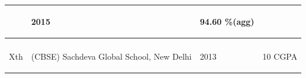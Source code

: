 \documentclass[11pt]{article}
\begin{document}
\begin{flushleft}
\begin{small}
\begin{tabular}{ |m{5.5cm}| m{5.5cm}| m{2cm}| m{4.5cm}| }
\begin{center}
\end{center}&

\begin{center}

2015

\end{center}&

\begin{center}

94.60 \%(agg)

\end{center}\\

\hline

\begin{center}

AISSE\\

Xth

\end{center}&

\begin{center}

(CBSE) Sachdeva Global School, New Delhi

\end{center}&

\begin{center}

2013

\end{center}&

\begin{center}

10 CGPA

\end{center}\\

\hline

\end{tabular}
\end{small}
\end{flushleft}
\end{document}
